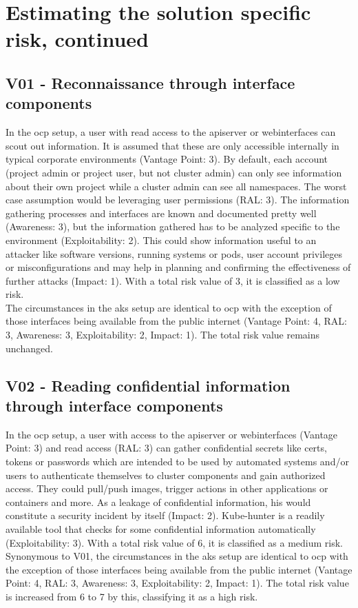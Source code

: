 \section{Estimating the solution specific risk, continued} \label{riskAssessmentContd}

\subsection{V01 - Reconnaissance through interface components}

In the \gls{ocp} setup, a user with read access to the apiserver or webinterfaces can scout out information. It is assumed that these are only accessible internally in typical corporate environments (Vantage Point: 3).
By default, each account (project admin or project user, but not cluster admin) can only see information about their own project while a cluster admin can see all namespaces.
The worst case assumption would be leveraging user permissions (RAL: 3).
The information gathering processes and interfaces are known and documented pretty well (Awareness: 3), but the information gathered has to be analyzed specific to the environment (Exploitability: 2).
This could show information useful to an attacker like software versions, running systems or pods, user account privileges or misconfigurations and may help in planning and confirming the effectiveness of further attacks (Impact: 1).
With a total risk value of 3, it is classified as a low risk. \\
The circumstances in the \gls{aks} setup are identical to \gls{ocp} with the exception of those interfaces being available from the public internet (Vantage Point: 4, RAL: 3, Awareness: 3, Exploitability: 2, Impact: 1). The total risk value remains unchanged.

\subsection{V02 - Reading confidential information through interface components}

In the \gls{ocp} setup, a user with access to the apiserver or webinterfaces (Vantage Point: 3) and read access (RAL: 3) can gather confidential secrets like certs, tokens or passwords which are intended to be used by automated systems and/or users to authenticate themselves to cluster components and gain authorized access. They could pull/push images, trigger actions in other applications or containers and more. As a leakage of confidential information, his would constitute a security incident by itself (Impact: 2). 
Kube-hunter is a readily available tool that checks for some confidential information automatically (Exploitability: 3).
With a total risk value of 6, it is classified as a medium risk. \\
Synonymous to V01, the circumstances in the \gls{aks} setup are identical to \gls{ocp} with the exception of those interfaces being available from the public internet (Vantage Point: 4, RAL: 3, Awareness: 3, Exploitability: 2, Impact: 1). 
The total risk value is increased from 6 to 7 by this, classifying it as a high risk.


